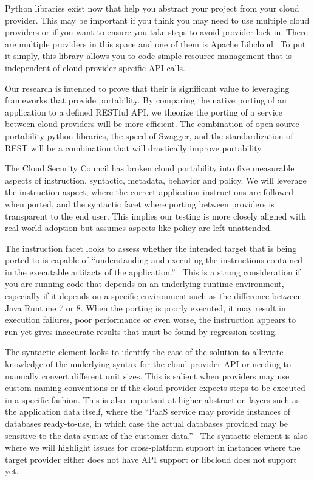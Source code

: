 Python libraries exist now that help you abstract your project from  your cloud
provider. This may be important if you think you may need to use multiple cloud
providers or if you want to ensure you take steps to avoid provider lock-in.
There are multiple providers in this space and one of them is Apache
Libcloud~\cite{hid-sp18-518-LibCloud} To put it simply, this library allows you
to code simple resource  management that is independent of cloud provider
specific API calls.

Our research is intended to prove that their is significant value to leveraging
frameworks that provide portability. By comparing the native porting of an
application to a defined RESTful API, we theorize the porting of a service
between cloud providers will be more efficient. The combination of open-source
portability python libraries, the speed of Swagger, and the standardization of
REST will be a combination that will drastically improve portability.

The Cloud Security Council has broken cloud portability into five measurable
aspects of instruction, syntactic, metadata, behavior and policy. We will
leverage the instruction aspect, where the correct application instructions are
followed when ported, and the syntactic facet where porting between providers
is
transparent to the end user. This implies our testing is more closely aligned
with real-world adoption but assumes aspects like policy are left
unattended.~\cite{hid-sp18-518-Cloud-Council}

The instruction facet looks to assess whether the intended target that is being
ported to is capable of ``understanding and executing the instructions
contained
in the executable artifacts of the
application.''~\cite{hid-sp18-518-Cloud-Council} This is a strong consideration
if you are running code that depends on an underlying runtime environment,
especially if it depends on a specific environment such as the difference
between Java Runtime 7 or 8. When the porting is poorly executed, it may result
in execution failures, poor performance or even worse, the instruction appears
to run yet gives inaccurate results that must be found by regression testing.

The syntactic element looks to identify the ease of the solution to alleviate
knowledge of the underlying syntax for the cloud provider API or needing to
manually convert different unit sizes. This is salient when providers may use
custom naming conventions or if the cloud provider expects steps to be executed
in a specific fashion. This is also important at higher abstraction layers such
as the application data itself, where the ``PaaS service may provide instances
of databases ready-to-use, in which case the actual databases provided may be
sensitive to the data syntax of the customer
data.''~\cite{hid-sp18-518-Cloud-Council} The syntactic element is also where
we will highlight issues for cross-platform support in instances where the
target provider either does not have API support or libcloud does not support
yet.

